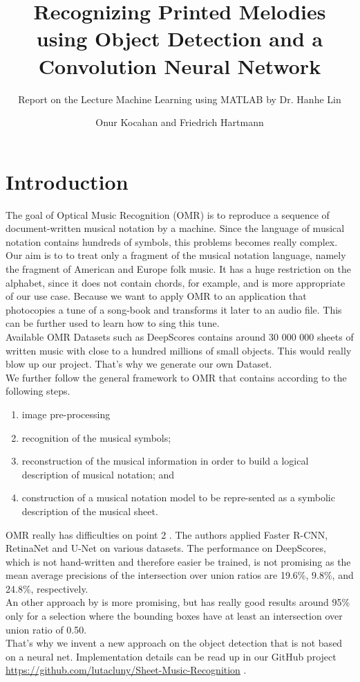 \documentclass{llncs}
\title{Recognizing Printed Melodies using Object Detection and a Convolution Neural Network}
\subtitle{Report on the Lecture Machine Learning using MATLAB by Dr. Hanhe Lin}
\author{Onur Kocahan and Friedrich Hartmann}
\institute{University of Konstanz}
\begin{document}
 
\maketitle
\section{Introduction}
The goal of Optical Music Recognition (OMR) is to reproduce a sequence of document-written musical notation by a machine. Since the language of musical notation contains hundreds of symbols, this problems becomes really complex. \\
Our aim is to to treat only a fragment of the musical notation language, namely the fragment of American and Europe folk music. It has a huge restriction on the alphabet, since it does not contain chords, for example, and is more appropriate of our use case. Because we want to apply OMR to an application that photocopies a tune of a song-book and transforms it later to an audio file. This can be further used to learn how to sing this tune.  \\
Available OMR Datasets such as DeepScores \citep{DeepScores} contains around 30 000 000 sheets of written music with close to a hundred millions of small objects. This would really blow up our project. That's why we generate our own Dataset. \\
We further follow the general framework to OMR that contains according to \citet{state_of_the_art} the following steps. 
\begin{enumerate}
 \item image pre-processing
 \item recognition of the musical symbols;
 \item reconstruction of the musical information in order to build a logical description of musical notation; and
 \item construction of a musical notation model to be repre-sented as a symbolic description of the musical sheet.
\end{enumerate}
OMR really has difficulties on point 2 \citep{Baseline}. The authors applied Faster R-CNN, RetinaNet and U-Net on various datasets. The performance on DeepScores, which is not hand-written and therefore easier be trained, is not promising as the mean average precisions of the intersection over union ratios are 19.6\%, 9.8\%, and 24.8\%, respectively. \\
An other approach by \citet{GitHub_OMR} is more promising, but has really good results around 95\% only for a selection where the bounding boxes have at least an intersection over union ratio of 0.50. \\
That's why we invent a new approach on the object detection that is not based on a neural net. Implementation details can be read up in our GitHub project \url{https://github.com/lutacluny/Sheet-Music-Recognition} .
\end{document}
